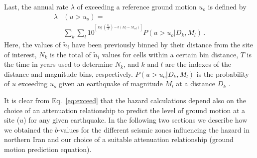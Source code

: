 Last, the annual rate $\lambda$ of exceeding a reference ground motion $u_o$ is defined by
% 
\begin{align}
	\lambda & \left( u > u_o \right) = \nonumber \\
		& \sum_{k} \sum_{l} 10^{ {}^{ \left[ \log \left( \frac{ N_{k} }{ T } \right) - b \left( M_l - M_{\mathrm{ref}} \right) \right] } }
		P \left( u > u_o | D_k , M_l \right)
		\, .
	\label{eq:exceed}
\end{align}
% 
Here, the values of $\tilde{n}_i$ have been previously binned by their distance from the site of interest, $N_k$ is the total of $\tilde{n}_i$ values for cells within a certain bin distance, $T$ is the time in years used to determine $N_k$, and $k$ and $l$ are the indexes of the distance and magnitude bins, respectively. $P ( u > u_o | D_k , M_l )$ is the probability of $u$ exceeding $u_o$ given an earthquake of magnitude $M_l$ at a distance $D_k$ \citep{Frankel1995}.

It is clear from Eq.~\ref{eq:exceed} that the hazard calculations depend also on the choice of an attenuation relationship to predict the level of ground motion at a site ($u$) for any given earthquake. In the following two sections we describe how we obtained the $b$-values for the different seismic zones influencing the hazard in northern Iran and our choice of a suitable attenuation relationship (ground motion prediction equation).

